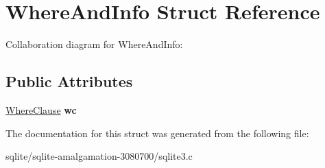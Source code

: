 \hypertarget{struct_where_and_info}{\section{Where\+And\+Info Struct Reference}
\label{struct_where_and_info}
}


Collaboration diagram for Where\+And\+Info\+:
\subsection*{Public Attributes}
\begin{DoxyCompactItemize}
\item 
\hypertarget{struct_where_and_info_a01cea99f069b1e598004a1cd0d0c3a80}{\hyperlink{struct_where_clause}{Where\+Clause} {\bfseries wc}}\label{struct_where_and_info_a01cea99f069b1e598004a1cd0d0c3a80}

\end{DoxyCompactItemize}


The documentation for this struct was generated from the following file\+:\begin{DoxyCompactItemize}
\item 
sqlite/sqlite-\/amalgamation-\/3080700/sqlite3.\+c\end{DoxyCompactItemize}
